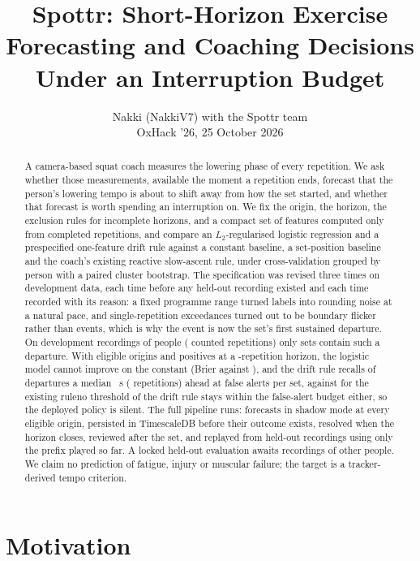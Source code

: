 \documentclass[11pt,a4paper]{article}
\title{Spottr: Short-Horizon Exercise Forecasting and Coaching Decisions Under an Interruption Budget}
\author{Nakki (NakkiV7) with the Spottr team \\ OxHack '26, 25 October 2026}
\date{}
\begin{document}
\maketitle

\begin{abstract}
A camera-based squat coach measures the lowering phase of every repetition. We ask whether those measurements, available the moment a repetition ends, forecast that the person's lowering tempo is about to shift away from how the set started, and whether that forecast is worth spending an interruption on. We fix the origin, the horizon, the exclusion rules for incomplete horizons, and a compact set of features computed only from completed repetitions, and compare an $L_2$-regularised logistic regression and a prespecified one-feature drift rule against a constant baseline, a set-position baseline and the coach's existing reactive slow-ascent rule, under cross-validation grouped by person with a paired cluster bootstrap. The specification was revised three times on development data, each time before any held-out recording existed and each time recorded with its reason: a fixed programme range turned labels into rounding noise at a natural pace, and single-repetition exceedances turned out to be boundary flicker rather than events, which is why the event is now the set's first sustained departure. On \NRecordings{} development recordings of \NPeople{} people (\NCounted{} counted repetitions) only \EventsDev{} sets contain such a departure. With \NDevOrigins{} eligible origins and \NDevPositive{} positives at a \Horizon-repetition horizon, the logistic model cannot improve on the constant (Brier \BrierFull{} against \BrierConst), and \ifdefined\DriftRuleFound the drift rule recalls \RecallDrift{} of departures a median \LeadDrift~s (\LeadDriftReps{} repetitions) ahead at \FADrift{} false alerts per set, against \RecallHeur{} for the existing rule\else no threshold of the drift rule stays within the false-alert budget either, so the deployed policy is silent\fi. The full pipeline runs: forecasts in shadow mode at every eligible origin, persisted in TimescaleDB before their outcome exists, resolved when the horizon closes, reviewed after the set, and replayed from held-out recordings using only the prefix played so far. A locked held-out evaluation awaits recordings of other people. We claim no prediction of fatigue, injury or muscular failure; the target is a tracker-derived tempo criterion.
\end{abstract}

\section{Motivation}
\end{document}
